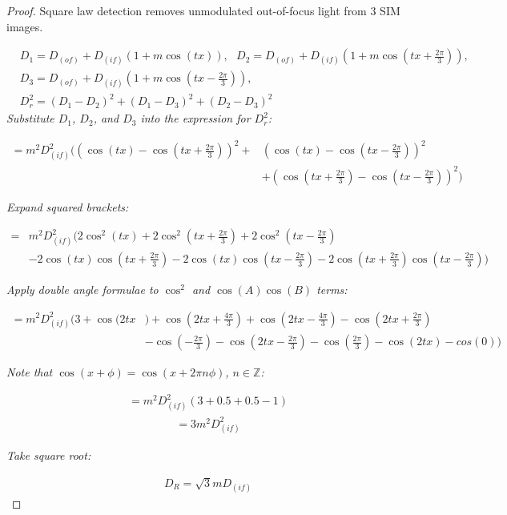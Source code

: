 \begin{proof}
\caption{Square law detection removes unmodulated out-of-focus light from 3 SIM images.}\label{pro:square}

\begin{align*}
&D_1 = D_{\left(of\right)} + D_{\left(if\right)}(1+m\cos(tx)),~~~D_2 = D_{\left(of\right)} + D_{\left(if\right)}(1+m\cos(tx+\frac{2\pi}{3})), \\
&D_3 = D_{\left(of\right)} + D_{\left(if\right)}(1+m\cos(tx-\frac{2\pi}{3})), \\[6pt]
&D_r^2 = (D_1 - D_2)^2 + (D_1 - D_3)^2 + (D_2 - D_3)^2
\end{align*}
\textit{Substitute $D_1$, $D_2$, and $D_3$ into the expression for $D_r^2$:}

\begin{align*}
= m^2 D_{\left(if\right)}^2\Bigg(\left(\cos(tx)-\cos(tx+\frac{2\pi}{3})\right)^2+&\left(\cos(tx)-\cos(tx-\frac{2\pi}{3})\right)^2\\&+\left(\cos(tx+\frac{2\pi}{3})-\cos(tx-\frac{2\pi}{3})\right)^2\Bigg)
\end{align*}

\textit{Expand squared brackets:}

\begin{align*}
=& m^2 D_{\left(if\right)}^2\Big(2\cos^2(tx) + 2\cos^2(tx+\frac{2\pi}{3}) + 2\cos^2(tx-\frac{2\pi}{3})
 \\& - 2\cos(tx)\cos(tx+\frac{2\pi}{3}) - 2\cos(tx)\cos(tx-\frac{2\pi}{3}) - 2\cos(tx+\frac{2\pi}{3})\cos(tx-\frac{2\pi}{3})\Big)
\end{align*}

\textit{Apply double angle formulae to $\cos^2$ and $\cos(A)\cos(B)$ terms:}

\begin{align*}
= m^2 D_{\left(if\right)}^2\Big(3 + \cos(2tx&) + \cos(2tx+\frac{4\pi}{3}) + \cos(2tx-\frac{4\pi}{3})
- \cos(2tx+\frac{2\pi}{3}) \\&- \cos(-\frac{2\pi}{3}) - \cos(2tx-\frac{2\pi}{3}) - \cos(\frac{2\pi}{3}) -\cos(2tx) - cos(0)\Big)
\end{align*}

\textit{Note that $\cos(x+\phi) = \cos(x+2\pi n\phi)$, $n\in \mathbb{Z}$:}

\begin{align*}
= m^2 D_{\left(if\right)}^2(3 + 0.5 + 0.5 - 1)
\end{align*}
\begin{align*}
= 3m^2 D_{\left(if\right)}^2
\end{align*}

\textit{Take square root:}

\begin{align*}
D_R = \sqrt3 m D_{\left(if\right)}
\end{align*}

\end{proof}

